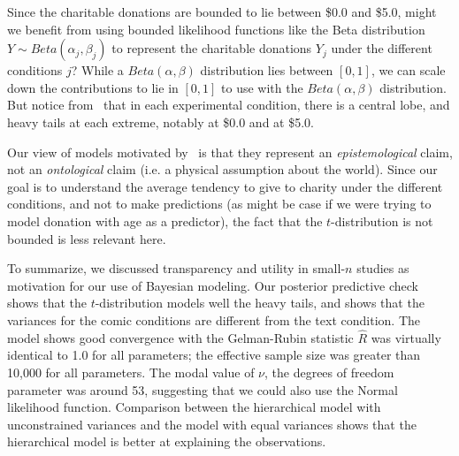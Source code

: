 Since the charitable donations are bounded to lie between \$0.0 and \$5.0, might we benefit from using bounded likelihood functions like the Beta distribution $Y \sim Beta(\alpha_j, \beta_j)$ to represent the charitable donations $Y_j$ under the different conditions $j$? While a $Beta(\alpha, \beta)$ distribution lies between $[0,1]$, we can scale down the contributions to lie in $[0,1]$ to use with the $Beta(\alpha, \beta)$ distribution. But notice from~ that in each experimental condition, there is a central lobe, and heavy tails at each extreme, notably at \$0.0 and at \$5.0. 

Our view of models motivated by~\textcite{McElreath2015} is that they represent an \textit{epistemological} claim, not an \textit{ontological} claim (i.e. a physical assumption about the world). Since our goal is to understand the average tendency to give to charity under the different conditions, and not to make predictions (as might be case if we were trying to model donation with age as a predictor), the fact that the $t$-distribution is not bounded is less relevant here. 

To summarize, we discussed transparency and utility in small-$n$ studies as motivation for our use of Bayesian modeling. Our posterior predictive check shows that the $t$-distribution models well the heavy tails, and shows that the variances for the comic conditions are different from the text condition. The model shows good convergence with the Gelman-Rubin statistic $\hat{R}$ was virtually identical to 1.0 for all parameters; the effective sample size was greater than 10,000 for all parameters. The modal value of $\nu$, the degrees of freedom parameter was around 53, suggesting that we could also use the Normal likelihood function. Comparison between the hierarchical model with unconstrained variances and the model with equal variances shows that the hierarchical model is better at explaining the observations.


